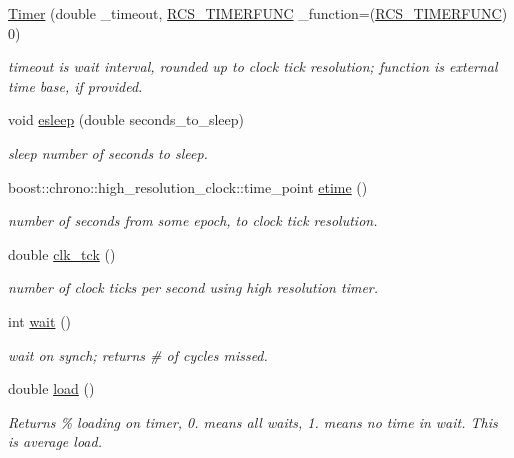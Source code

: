 \begin{DoxyCompactItemize}
\item 
\hyperlink{classRCS_1_1Timer_a31096c4873d54bc2bd59e9349d8de634}{Timer} (double \-\_\-timeout, \hyperlink{namespaceRCS_ae5dd02ab24956844fae02f10de954ad5}{R\-C\-S\-\_\-\-T\-I\-M\-E\-R\-F\-U\-N\-C} \-\_\-function=(\hyperlink{namespaceRCS_ae5dd02ab24956844fae02f10de954ad5}{R\-C\-S\-\_\-\-T\-I\-M\-E\-R\-F\-U\-N\-C}) 0)
\begin{DoxyCompactList}\small\item\em timeout is wait interval, rounded up to clock tick resolution; function is external time base, if provided. \end{DoxyCompactList}\item 
void \hyperlink{classRCS_1_1Timer_a951188b514c0c371f1b2f47c3f6861af}{esleep} (double seconds\-\_\-to\-\_\-sleep)
\begin{DoxyCompactList}\small\item\em sleep number of seconds to sleep. \end{DoxyCompactList}\item 
boost\-::chrono\-::high\-\_\-resolution\-\_\-clock\-::time\-\_\-point \hyperlink{classRCS_1_1Timer_a375a179a8236c14fac3da8c791e26994}{etime} ()
\begin{DoxyCompactList}\small\item\em number of seconds from some epoch, to clock tick resolution. \end{DoxyCompactList}\item 
double \hyperlink{classRCS_1_1Timer_ae552e3eda5b4e0633ed2174b9e513657}{clk\-\_\-tck} ()
\begin{DoxyCompactList}\small\item\em number of clock ticks per second using high resolution timer. \end{DoxyCompactList}\item 
int \hyperlink{classRCS_1_1Timer_a1e33cc91158802fb37003445bd77ad64}{wait} ()
\begin{DoxyCompactList}\small\item\em wait on synch; returns \# of cycles missed. \end{DoxyCompactList}\item 
double \hyperlink{classRCS_1_1Timer_a3c56c4237a97887278ec307101d93d93}{load} ()
\begin{DoxyCompactList}\small\item\em Returns \% loading on timer, 0. means all waits, 1. means no time in wait. This is average load. \end{DoxyCompactList}\item 

\end{DoxyCompactItemize}
